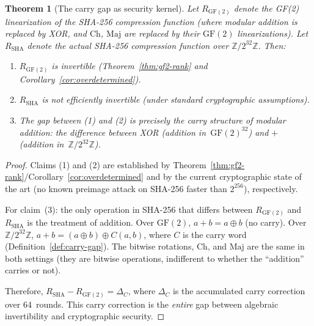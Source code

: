 \documentclass[12pt, a4paper]{article}
\theoremstyle{plain}
\newtheorem{theorem}{Theorem}[section]
\theoremstyle{definition}
\newcommand{\Z}{\mathbb{Z}}
\newcommand{\GF}{\mathrm{GF}}
\newcommand{\Ch}{\mathrm{Ch}}
\newcommand{\Maj}{\mathrm{Maj}}
\begin{document}
\begin{theorem}[The carry gap as security kernel]\label{thm:carry-security}
Let $R_{\GF(2)}$ denote the GF(2) linearization of the SHA-256
compression function (where modular addition is replaced by XOR,
and $\Ch$, $\Maj$ are replaced by their $\GF(2)$ linearizations).
Let $R_{\text{SHA}}$ denote the actual SHA-256 compression function
over $\Z/2^{32}\Z$.
Then:
\begin{enumerate}[nosep]
  \item $R_{\GF(2)}$ is invertible (Theorem~\ref{thm:gf2-rank}
        and Corollary~\ref{cor:overdetermined}).
  \item $R_{\text{SHA}}$ is not efficiently invertible (under
        standard cryptographic assumptions).
  \item The gap between (1) and (2) is precisely the carry
        structure of modular addition: the difference between
        XOR (addition in~$\GF(2)^{32}$) and $+$ (addition
        in~$\Z/2^{32}\Z$).
\end{enumerate}
\end{theorem}

\begin{proof}
Claims (1) and (2) are established by
Theorem~\ref{thm:gf2-rank}/Corollary~\ref{cor:overdetermined}
and by the current cryptographic state of the art (no known
preimage attack on SHA-256 faster than $2^{256}$), respectively.

For claim~(3): the only operation in SHA-256 that differs between
$R_{\GF(2)}$ and $R_{\text{SHA}}$ is the treatment of addition.
Over $\GF(2)$, $a+b=a\oplus b$ (no carry).
Over $\Z/2^{32}\Z$, $a+b=(a\oplus b)\oplus C(a,b)$, where $C$
is the carry word (Definition~\ref{def:carry-gap}).
The bitwise rotations, $\Ch$, and $\Maj$ are the same in both
settings (they are bitwise operations, indifferent to whether
the ``addition'' carries or not).

Therefore, $R_{\text{SHA}}-R_{\GF(2)}=\Delta_{C}$, where
$\Delta_{C}$ is the accumulated carry correction over 64~rounds.
This carry correction is the \emph{entire} gap between algebraic
invertibility and cryptographic security.
\end{proof}
\end{document}
